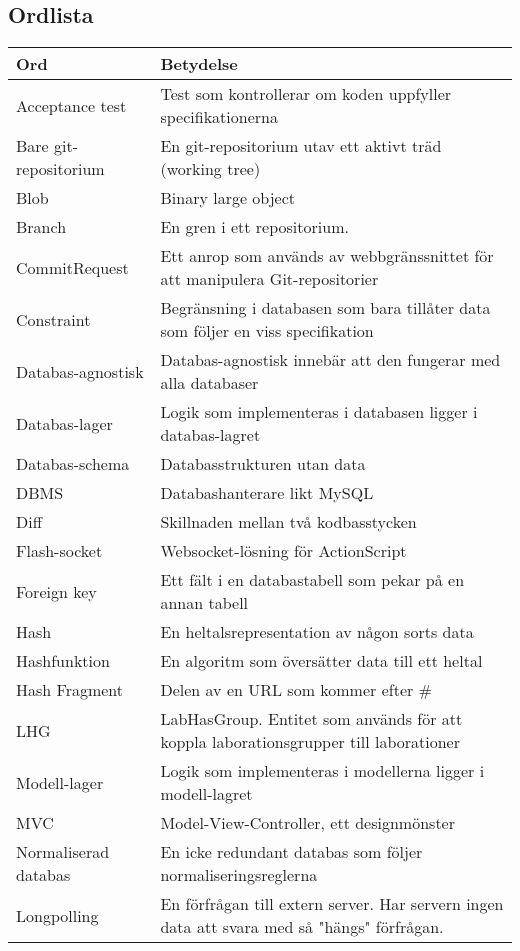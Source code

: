 \subsection{Ordlista}
\label{sec:ordlista}
\small
\begin{tabular} { | l | p{10cm} | }
\hline
\bf{Ord} & \bf{Betydelse} \\
\hline
Acceptance test	& Test som kontrollerar om koden uppfyller specifikationerna \\
\hline
Bare git-repositorium & En git-repositorium utav ett aktivt träd (working tree) \\
\hline
Blob & Binary large object \\
\hline
Branch & En gren i ett repositorium. \\
\hline
CommitRequest & Ett anrop som används av webbgränssnittet för att manipulera Git-repositorier \\
\hline
Constraint & Begränsning i databasen som bara tillåter data som följer en viss specifikation \\
\hline
Databas-agnostisk & Databas-agnostisk innebär att den fungerar med alla databaser \\
\hline
Databas-lager & Logik som implementeras i databasen ligger i databas-lagret \\
\hline
Databas-schema & Databasstrukturen utan data \\
\hline
DBMS & Databashanterare likt MySQL \\
\hline
Diff & Skillnaden mellan två kodbasstycken \\
\hline
Flash-socket & Websocket-lösning för ActionScript \\
\hline
Foreign key & Ett fält i en databastabell som pekar på en annan tabell \\
\hline
Hash & En heltalsrepresentation av någon sorts data \\
\hline
Hashfunktion & En algoritm som översätter data till ett heltal \\
\hline
Hash Fragment & Delen av en URL som kommer efter \# \\
\hline
LHG & LabHasGroup. Entitet som används för att koppla laborationsgrupper till laborationer \\
\hline
Modell-lager & Logik som implementeras i modellerna ligger i modell-lagret \\
\hline
MVC & Model-View-Controller, ett designmönster \\
\hline
Normaliserad databas & En icke redundant databas som följer normaliseringsreglerna \\
\hline
Longpolling & En förfrågan till extern server. Har servern ingen data att svara med så "hängs" förfrågan. \\
\hline
\end{tabular}

